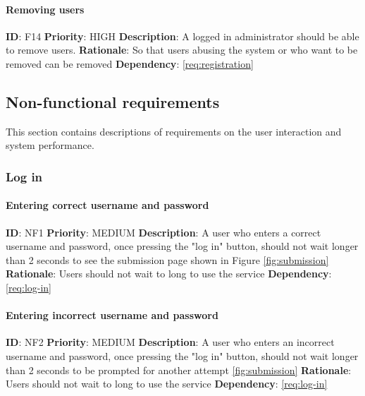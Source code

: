 \documentclass{article}
\begin{document}
\paragraph{Removing users}\label{req:removingUser}
\textbf{ID}: F14\newline
\textbf{Priority}: HIGH\newline
\textbf{Description}: A logged in administrator should be able to remove users. \newline
\textbf{Rationale}: So that users abusing the system or who want to be removed can be removed\newline
\textbf{Dependency}: \ref{req:registration}\newline


\subsection{Non-functional requirements}
This section contains descriptions of requirements on the user interaction and system performance.


\subsubsection{Log in}

\paragraph{Entering correct username and password}\label{req:}
\textbf{ID}: NF1\newline
\textbf{Priority}: MEDIUM\newline
\textbf{Description}: A user who enters a correct username and password, once pressing the "log in" button, should not wait longer than 2 seconds to see the submission page shown in Figure \ref{fig:submission}\newline
\textbf{Rationale}: Users should not wait to long to use the service\newline
\textbf{Dependency}: \ref{req:log-in} \newline

\paragraph{Entering incorrect username and password}\label{req:}
\textbf{ID}: NF2\newline
\textbf{Priority}: MEDIUM\newline
\textbf{Description}: A user who enters an incorrect username and password, once pressing the "log in" button, should not wait longer than 2 seconds to be prompted for another attempt \ref{fig:submission}\newline
\textbf{Rationale}: Users should not wait to long to use the service\newline
\textbf{Dependency}: \ref{req:log-in} \newline
\end{document}
